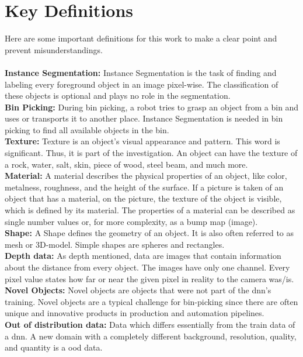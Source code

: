 	
	
	\section{Key Definitions}
	\label{sec:key-definitions}
	
		Here are some important definitions for this work to make a clear point and prevent misunderstandings.\\
		\\
		\textbf{Instance Segmentation:} Instance Segmentation is the task of finding and labeling every foreground object in an image pixel-wise. The classification of these objects is optional and plays no role in the segmentation.\\
		\textbf{Bin Picking:} During bin picking, a robot tries to grasp an object from a bin and uses or transports it to another place. Instance Segmentation is needed in bin picking to find all available objects in the bin.\\
		\textbf{Texture:} Texture is an object's visual appearance and pattern. This word is significant. Thus, it is part of the investigation. An object can have the texture of a rock, water, salt, skin, piece of wood, steel beam, and much more.\\
		\textbf{Material:} A material describes the physical properties of an object, like color, metalness, roughness, and the height of the surface. If a picture is taken of an object that has a material, on the picture, the texture of the object is visible, which is defined by its material. The properties of a material can be described as single number values or, for more complexity, as a bump map (image).\\
		\textbf{Shape:} A Shape defines the geometry of an object. It is also often referred to as mesh or 3D-model. Simple shapes are spheres and rectangles.\\
		\textbf{Depth data:} As depth mentioned, data are images that contain information about the distance from every object. The images have only one channel. Every pixel value states how far or near the given pixel in reality to the camera was/is.\\
		\textbf{Novel Objects:} Novel objects are objects that were not part of the \ac{dnn}'s training. Novel objects are a typical challenge for bin-picking since there are often unique and innovative products in production and automation pipelines.\\
		\textbf{Out of distribution data:} Data which differs essentially from the train data of a \ac{dnn}. A new domain with a completely different background, resolution, quality, and quantity is a \ac{ood} data.\\
